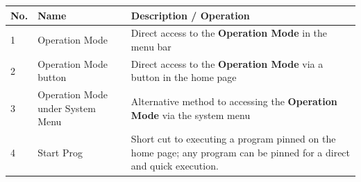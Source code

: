 \begin{longtable}[]{@{}lll@{}}
\toprule
\begin{minipage}[b]{0.04\columnwidth}\raggedright
No.\strut
\end{minipage} & \begin{minipage}[b]{0.23\columnwidth}\raggedright
Name\strut
\end{minipage} & \begin{minipage}[b]{0.65\columnwidth}\raggedright
Description / Operation\strut
\end{minipage}\tabularnewline
\midrule
\endhead
\begin{minipage}[t]{0.04\columnwidth}\raggedright
1\strut
\end{minipage} & \begin{minipage}[t]{0.23\columnwidth}\raggedright
Operation Mode\strut
\end{minipage} & \begin{minipage}[t]{0.65\columnwidth}\raggedright
Direct access to the \textbf{Operation Mode} in the menu bar\strut
\end{minipage}\tabularnewline
\begin{minipage}[t]{0.04\columnwidth}\raggedright
2\strut
\end{minipage} & \begin{minipage}[t]{0.23\columnwidth}\raggedright
Operation Mode button\strut
\end{minipage} & \begin{minipage}[t]{0.65\columnwidth}\raggedright
Direct access to the \textbf{Operation Mode} via a button in the home
page\strut
\end{minipage}\tabularnewline
\begin{minipage}[t]{0.04\columnwidth}\raggedright
3\strut
\end{minipage} & \begin{minipage}[t]{0.23\columnwidth}\raggedright
Operation Mode under System Menu\strut
\end{minipage} & \begin{minipage}[t]{0.65\columnwidth}\raggedright
Alternative method to accessing the \textbf{Operation Mode} via the
system menu\strut
\end{minipage}\tabularnewline
\begin{minipage}[t]{0.04\columnwidth}\raggedright
4\strut
\end{minipage} & \begin{minipage}[t]{0.23\columnwidth}\raggedright
Start Prog\strut
\end{minipage} & \begin{minipage}[t]{0.65\columnwidth}\raggedright
Short cut to executing a program pinned on the home page; any program
can be pinned for a direct and quick execution.\strut
\end{minipage}\tabularnewline
\bottomrule
\end{longtable}

